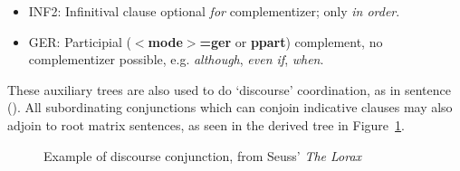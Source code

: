 \begin{itemize}
\item INF2: Infinitival clause optional {\it for} complementizer; only {\it
in order}.
\hspace{0.5in}%
\hspace{0.5in}%

\item GER: Participial ({\bf $<$mode$>$=ger} or {\bf ppart}) complement, no
complementizer possible, e.g. {\it although}, {\it even if}, {\it
when}. 
\hspace{0.5in}%
\hspace{0.5in}%

\end{itemize}

These auxiliary trees are also used to do `discourse' coordination, as in
sentence ().  All subordinating conjunctions which can conjoin indicative
clauses may also adjoin to root matrix sentences, as seen in the derived tree
in Figure~\ref{seuss-sentence}.


\begin{figure}[htb]
\centering
\hspace{0in}
\caption{Example of discourse conjunction, from Seuss' {\it The
Lorax}\nocite{seuss71}}
\label{seuss-sentence}
\end{figure}







